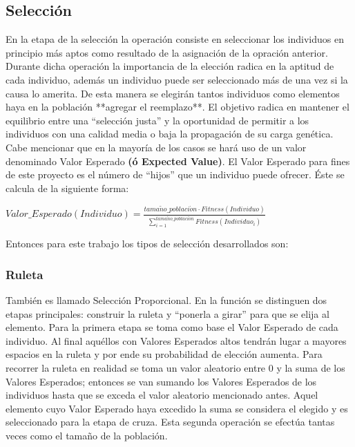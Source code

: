 \documentclass[class=report, crop=false]{standalone}
\begin{document}
\subsection{Selección}
\label{sec:c2_4}
En la etapa de la selección la operación consiste en seleccionar 
los individuos en principio más aptos como resultado de 
la asignación de la opración anterior.
Durante dicha operación la importancia de la elección radica 
en la aptitud de cada individuo, además un individuo puede ser 
seleccionado más de una vez si la causa lo amerita.\break
De esta manera se elegirán tantos individuos como elementos haya 
en la población **agregar el reemplazo**.\medskip\break
El objetivo radica en mantener el equilibrio entre una ``selección 
justa'' y la oportunidad de permitir a los individuos con una 
calidad media o baja la propagación de su carga genética.\medskip\break
Cabe mencionar que en la mayoría de los casos se hará uso de un
valor denominado Valor Esperado \textbf{(ó Expected Value)}. 
El Valor Esperado para fines de este proyecto es el número de 
``hijos'' que un individuo puede ofrecer. Éste se calcula de 
la siguiente forma:\medskip\break
\centerline{$Valor\_Esperado(Individuo) = \frac{tama\tilde{n}o\_poblaci\acute{o}n \cdot Fitness(Individuo)}{\sum_{i=1}^{tama\tilde{n}o\_poblaci\acute{o}n}Fitness(Individuo_i)}$}\medskip\break
Entonces para este trabajo los tipos de selección desarrollados 
son:

\subsubsection{Ruleta}
También es llamado Selección Proporcional.\break
En la función se distinguen dos etapas principales: construir 
la ruleta y ``ponerla a girar'' para que se elija al elemento.\break
Para la primera etapa se toma como base el Valor Esperado de 
cada individuo.\break
Al final aquéllos con Valores Esperados altos tendrán lugar 
a mayores espacios en la ruleta y por ende su probabilidad de 
elección aumenta.\medskip\break
Para recorrer la ruleta en realidad se toma un valor aleatorio 
entre 0 y la suma de los Valores Esperados; entonces se van 
sumando los Valores Esperados de los individuos hasta que se 
exceda el valor aleatorio mencionado antes.\break
Aquel elemento cuyo Valor Esperado haya excedido la suma se 
considera el elegido y es seleccionado para la etapa de cruza.\break
Esta segunda operación se efectúa tantas veces como el tamaño 
de la población.
\end{document}
